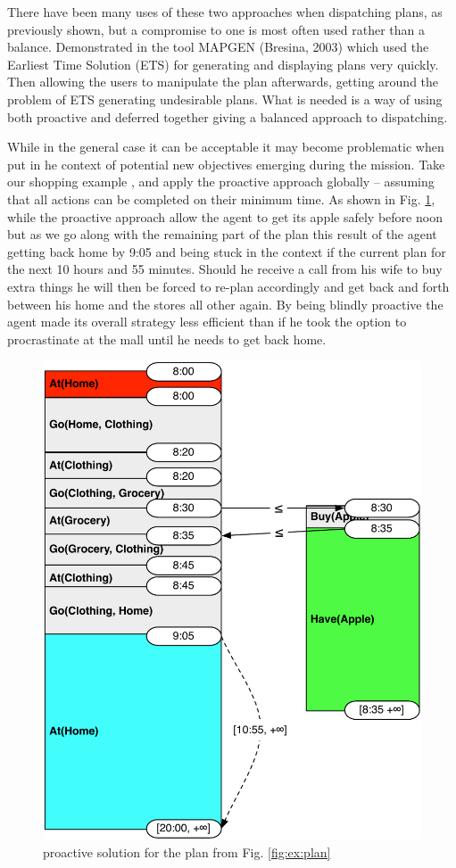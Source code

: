 There
have been many uses of these two approaches when dispatching plans, as
previously shown, but a compromise to one is most often used rather than
a balance. Demonstrated in the tool MAPGEN (Bresina, 2003) which used
the Earliest Time Solution (ETS) for generating and displaying plans
very quickly. Then allowing the users to manipulate the plan afterwards,
getting around the problem of ETS generating undesirable plans. What is
needed is a way of using both proactive and deferred together giving a
balanced approach to dispatching.

While in the general case it can be acceptable it
may become problematic when put in he context of potential new
objectives emerging during the mission.  Take our shopping example ,
and apply the proactive approach globally -- assuming that all actions
can be completed on their minimum time.  As shown in 
Fig. \ref{fig:ex:proactive}, while the proactive approach allow the
agent to get its apple safely before noon but as we go along with the
remaining part of the plan this  result of the agent getting back home
by 9:05 and being stuck in the context if the current plan for the
next 10 hours and 55 minutes. Should he receive a call from his wife
to buy extra things he will then be forced to re-plan accordingly and
get back and forth between his home and the stores all other
again. By being blindly proactive the agent made its overall strategy
less efficient than if he took the option to procrastinate at the mall
until he needs to get back home. 


\begin{figure}
  \centering
  \includegraphics[width=0.8\columnwidth]{figs/example_early}
  \caption{proactive solution for the plan from Fig. \ref{fig:ex:plan}}
  \label{fig:ex:proactive}
\end{figure}


